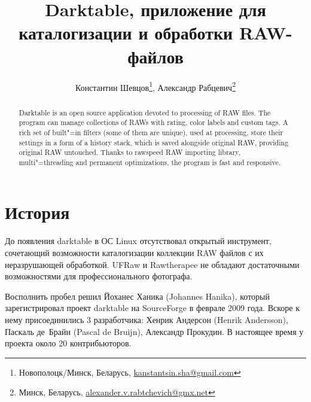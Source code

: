\documentclass[10pt, a5paper]{article}
\begin{document}
\title{Darktable, приложение для каталогизации и обработки RAW-файлов}
\author{Константин Шевцов\footnote{Новополоцк/Минск, Беларусь, \url{kanstantsin.sha@gmail.com}}, Александр Рабцевич\footnote{Минск, Беларусь, \url{alexander.v.rabtchevich@gmx.net}}}
\date{}

\def\progref!#1!{\texttt{#1}}

\maketitle

\begin{abstract}
Darktable is an open source application devoted to processing of RAW files. The program can manage collections of RAWs with rating, color labels and custom tags. A rich set of built"=in filters (some of them are unique), used at processing, store their settings in a form of a history stack, which is saved alongside original RAW, providing original RAW untouched. Thanks to raw\-speed RAW importing library, multi"=threading and per\-ma\-nent op\-ti\-mi\-za\-tions, the program is fast and responsive.
\end{abstract}

\section*{История}

До появления darktable в ОС Linux отсутствовал открытый инструмент, сочетающий возможности каталогизации коллекции RAW файлов с их неразрушающей обработкой. UFRaw и  Rawtherapee не обладают достаточными возможностями для профессионального фотографа.

Восполнить пробел решил Йоханес Ханика (Johannes Hanika), который зарегистрировал проект darktable на SourceForge в феврале 2009 года. Вскоре к нему присоединились 3 разработчика: Хенрик Андерсон (Henrik Andersson), Паскаль де Брайн (Pascal de Bruijn), Александр Прокудин. В настоящее время у проекта около 20 контрибьюторов. 
\end{document}
